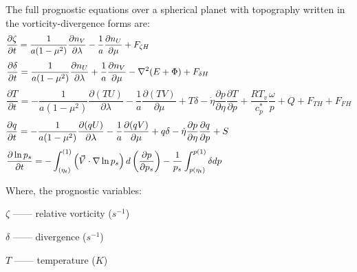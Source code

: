 \documentclass[12pt,a4paper]{book}
\begin{document}
The full prognostic equations over a spherical planet with topography written in the vorticity-divergence forms are:	
	\begin{equation} \label{eq:primitive_vor}
	\frac{\partial \zeta}{\partial t} = 
	\frac{1}{a(1-\mu^2)} \frac{\partial n_V}{\partial \lambda}
	-\frac{1}{a}         \frac{\partial n_U}{\partial \mu} 
	+ F_{\zeta H} \hspace{19 pc}
	\end{equation}	
	\begin{equation} \label{eq:primitive_div}
	\frac{\partial \delta}{\partial t} = 
	\frac{1}{a(1-\mu^2)} \frac{\partial n_U}{\partial \lambda}
	+\frac{1}{a}         \frac{\partial n_V}{\partial \mu} 
	-\nabla^2 (E + \Phi) 
	+ F_{\delta H}  \hspace{13 pc}
	\end{equation}
	\begin{equation} \label{eq:primitive_T}
	\frac{\partial T}{\partial t} = 
	-\frac{1}{a(1-\mu^2)} \frac{\partial (TU)}{\partial \lambda}
	-\frac{1}{a}          \frac{\partial (TV)}{\partial \mu}
	+ T\delta 
	- \dot{\eta} \frac{\partial p}{\partial \eta} \frac{\partial T}{\partial p} 
	+ \frac{RT_v}{c_p^*} \frac{\omega}{p}
	+ Q + F_{TH} + F_{FH}
	\end{equation} 
	\begin{equation} \label{eq:primitive_q}
	\frac{\partial q}{\partial t} = 
	-\frac{1}{a(1-\mu^2)} \frac{\partial (qU)}{\partial \lambda}
	-\frac{1}{a}          \frac{\partial (qV)}{\partial \mu}
	+ q\delta 
	- \dot{\eta} \frac{\partial p}{\partial \eta} \frac{\partial q}{\partial p} 
	+ S \hspace{11 pc}
	\end{equation} 
	\begin{equation} \label{eq:primitive_lnps}
	\frac{\partial \ln p_s}{\partial t} = 
	-\int_{(\eta_t)}^{(1)} \left( \vec{V}\cdot \nabla \ln p_s \right) d\left(\frac{\partial p}{\partial p_s} \right) 
	-\frac{1}{p_s} \int_{p(\eta_t)}^{p(1)} \delta dp  \hspace{12 pc}
	\end{equation} 

Where, the prognostic variables:

\hspace{2 pc}  $\zeta$ ------ relative vorticity ($s^{-1}$)

\hspace{2 pc}  $\delta$ ------ divergence ($s^{-1}$)

\hspace{2 pc}  $T$ ------ temperature ($K$)
\end{document}
